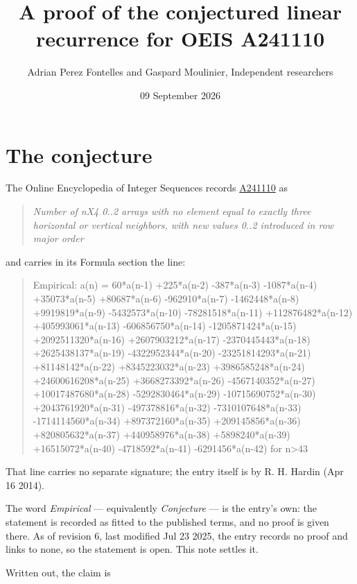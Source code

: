 \documentclass[11pt]{article}
\title{A proof of the conjectured linear recurrence for OEIS A241110}
\author{Adrian Perez Fontelles and Gaspard Moulinier, Independent researchers}
\date{09 September 2026}
\theoremstyle{definition}
\begin{document}
\maketitle
\section{The conjecture}

The Online Encyclopedia of Integer Sequences records \href{https://oeis.org/A241110}{A241110} as

\begin{quote}\itshape Number of nX4 0..2 arrays with no element equal to exactly three horizontal or vertical neighbors, with new values 0..2 introduced in row major order\end{quote}

and carries in its Formula section the line:

\begin{quote}\ttfamily Empirical: a(n) = 60*a(n-1) +225*a(n-2) -387*a(n-3) -1087*a(n-4) +35073*a(n-5) +80687*a(n-6) -962910*a(n-7) -1462448*a(n-8) +9919819*a(n-9) -5432573*a(n-10) -78281518*a(n-11) +112876482*a(n-12) +405993061*a(n-13) -606856750*a(n-14) -1205871424*a(n-15) +2092511320*a(n-16) +2607903212*a(n-17) -2370445443*a(n-18) +2625438137*a(n-19) -4322952344*a(n-20) -23251814293*a(n-21) +81148142*a(n-22) +8345223032*a(n-23) +3986585248*a(n-24) +24600616208*a(n-25) +3668273392*a(n-26) -4567140352*a(n-27) +10017487680*a(n-28) -5292830464*a(n-29) -10715690752*a(n-30) +2043761920*a(n-31) -497378816*a(n-32) -7310107648*a(n-33) -1714114560*a(n-34) +897372160*a(n-35) +209145856*a(n-36) +820805632*a(n-37) +440958976*a(n-38) +5898240*a(n-39) +16515072*a(n-40) -4718592*a(n-41) -6291456*a(n-42) for n>43\end{quote}

That line carries no separate signature; the entry itself is by R. H. Hardin (Apr 16 2014).

The word {\itshape Empirical} --- equivalently {\itshape Conjecture} --- is the entry's own: the statement is recorded as fitted to the published terms, and no proof is given there. As of revision 6, last modified Jul 23 2025, the entry records no proof and links to none, so the statement is open. This note settles it.

Written out, the claim is
\end{document}
